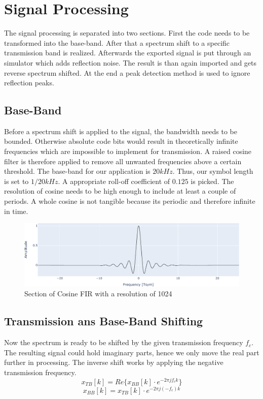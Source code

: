 
\chapter{Signal Processing}
The signal processing is separated into two sections. First the code needs to be transformed into the base-band. After that a spectrum shift to a specific transmission band is realized. Afterwards the exported signal is put through an simulator which adds reflection noise. The result is than again imported and gets reverse spectrum shifted. At the end a peak detection method is used to ignore reflection peaks.
\section{Base-Band}
Before a spectrum shift is applied to the signal, the bandwidth needs to be bounded. Otherwise absolute code bits would result in theoretically infinite frequencies which are impossible to implement for transmission. A raised cosine filter is therefore applied to remove all unwanted frequencies above a certain threshold. The base-band for our application is $20kHz$. Thus, our symbol length is set to $1/{20kHz}$. A appropriate roll-off coefficient of $0.125$ is picked. The resolution of cosine needs to be high enough to include at least a couple of periods.  A whole cosine is not tangible because its periodic and therefore infinite in time.
\begin{figure}[h]
	\includegraphics[width=\linewidth]{images/cosfir}
	\caption{Section of Cosine FIR with a resolution of 1024}
	\label{fig:cosfir}
\end{figure}
\section{Transmission ans Base-Band Shifting}
Now the spectrum is ready to be shifted by the given transmission frequency $f_c$. The resulting signal could hold imaginary parts, hence we only move the real part further in processing. The inverse shift works by applying the negative transmission frequency.
\begin{equation}
	x_{TB}[k]=Re\{x_{BB}[k]\cdot e^{-2\pi j f_c k}\}
	\label{eq:shift}
\end{equation}
\begin{equation}
	x_{BB}[k]=x_{TB}[k]\cdot e^{-2\pi j (-f_c) k}
	\label{eq:rshift}
\end{equation}

